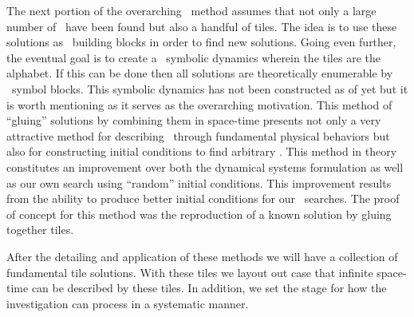 \begin{itemize}
{%
The next portion of the overarching \spt\ method assumes that not only a
large number of \twots\ have been found but also a handful of tiles.
The idea is to use these solutions as \spt\ building blocks in order to find new
solutions. Going even further, the eventual goal is to create a \spt\ symbolic dynamics
wherein the tiles are the alphabet. If this can be done then all solutions
are theoretically enumerable by \spt\ symbol blocks. This symbolic dynamics
has not been constructed as of yet but it is worth mentioning as it
serves as the overarching motivation.
This method of ``gluing'' solutions by combining them in space-time
presents not only a very attractive method for describing
\twots\ through fundamental physical behaviors but also for constructing
initial conditions to find arbitrary \twots.
This method in theory constitutes an improvement over both the dynamical systems formulation
as well as our own search using ``random'' initial conditions. This improvement
results from the ability to produce better initial conditions for our \spt\ searches.
The proof of concept for this method was the reproduction of a known
solution by gluing together tiles.

After the detailing and application of these methods we will have a
collection of fundamental tile solutions. With these tiles we layout out
case that infinite space-time can be described by these tiles. In addition,
we set the stage for how the investigation can process in a systematic manner.

}

\end{itemize}
